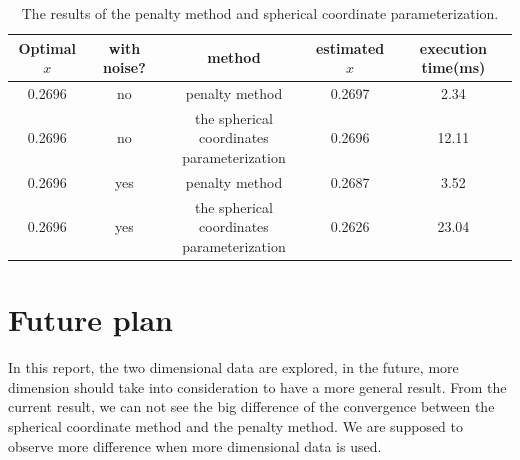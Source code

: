 \documentclass[a4paper,12pt]{article}
\begin{document}
\begin{table}[!ht]
\begin{center}
\begin{tabular}{|c|c|c|c|c|}
\hline
Optimal $x$&with noise?& method & estimated $x$&execution time(ms)\\
\hline
0.2696& no&penalty method&0.2697&2.34\\
\hline
0.2696& no& \makecell{ the spherical coordinates \\parameterization}&0.2696&12.11\\

\hline
\hline
0.2696& yes&penalty method&0.2687&3.52\\
\hline
0.2696& yes& \makecell{ the spherical coordinates \\parameterization}&0.2626&23.04\\

\hline

\end{tabular}
\end{center}
\caption{The results of the penalty method and spherical coordinate parameterization.}
\label{tab:poly_noise}
\end{table}
\section{Future plan}
In this report, the two dimensional data are explored, in the future, more dimension should take into consideration to have a more general result. From the current result, we can not see the big difference of the convergence between the spherical coordinate method and the penalty method. We are supposed to observe more difference when more dimensional data is used.\\




  
 
\end{document}
